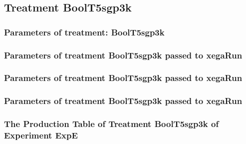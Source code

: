 \documentclass[18pt,c]{beamer}
\makeatletter
\def\beamer@writeslidentry@miniframesoff{%
  \expandafter\beamer@ifempty\expandafter{\beamer@framestartpage}{}%
  {%
   \clearpage\beamer@notesactions%
  }
}
\newcommand*{\miniframesoff}{\let\beamer@writeslidentry=\beamer@writeslidentry@miniframesoff}
\makeatother
\begin{document}
\miniframesoff
\subsection{Treatment BoolT5sgp3k}

 \begin{frame}
 \fontsize{8pt}{9pt}\selectfont
 \frametitle{  Parameters of treatment: BoolT5sgp3k 
 }

 \label{ExpEtParmTable024.tex}  
 \end{frame}


 \begin{frame}
 \fontsize{8pt}{9pt}\selectfont
 \frametitle{  Parameters of treatment BoolT5sgp3k passed to xegaRun
 }

 \label{ExpEtParmTable025.tex}  
 \end{frame}


 \begin{frame}
 \fontsize{8pt}{9pt}\selectfont
 \frametitle{  Parameters of treatment BoolT5sgp3k passed to xegaRun
 }

 \label{ExpEtParmTable026.tex}  
 \end{frame}


 \begin{frame}
 \fontsize{8pt}{9pt}\selectfont
 \frametitle{  Parameters of treatment BoolT5sgp3k passed to xegaRun
 }

 \label{ExpEtParmTable027.tex}  
 \end{frame}

 \begin{frame}
 \fontsize{8pt}{9pt}\selectfont
 \frametitle{ The Production Table of Treatment BoolT5sgp3k of Experiment ExpE }

 \label{ExpEGrammarTable009.tex}  
 \end{frame}
\end{document}
